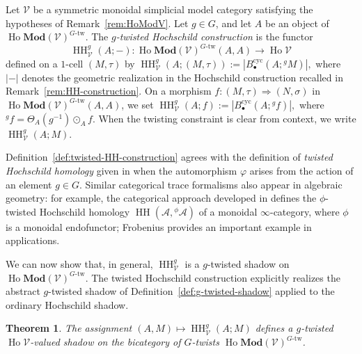 \documentclass[11pt,oneside]{amsart}
\DeclareMathOperator{\Ho}{Ho}
\DeclareMathOperator{\HH}{HH}
\numberwithin{equation}{section}
\numberwithin{figure}{section}
\theoremstyle{plain}
\newtheorem{thm}{Theorem}[section]
\theoremstyle{definition}
\theoremstyle{remark}
\begin{document}
\begin{definition}\label{def:twisted-HH-construction}
Let \(\mathcal V\) be a symmetric monoidal simplicial model category
satisfying the hypotheses of Remark~\ref{rem:HoModV}. Let \(g\in G\),
and let \(A\) be an object of
\(\Ho\mathbf{Mod}(\mathcal V)^{G\text{-tw}}\). The \emph{\(g\)-twisted Hochschild construction}
is the functor
\[
\HH_{\mathcal V}^g(A;-):
\Ho\mathbf{Mod}(\mathcal V)^{G\text{-tw}}(A,A)
\longrightarrow
\Ho\mathcal V
\]
defined on a \(1\)-cell \((M,\tau)\) by
\(
\HH_{\mathcal V}^g(A;(M,\tau))
:=
\left|B_\bullet^{\mathrm{cyc}}(A;{}^gM)\right|,
\)
where \(|-|\) denotes the geometric realization in the Hochschild construction
recalled in Remark~\ref{rem:HH-construction}.
On a morphism
\(
f:(M,\tau)\Rightarrow (N,\sigma)
\)
in \(\Ho\mathbf{Mod}(\mathcal V)^{G\text{-tw}}(A,A)\), we set
\(
\HH_{\mathcal V}^g(A;f)
:=
\left|B_\bullet^{\mathrm{cyc}}(A;{}^gf)\right|,
\)
where \({}^gf=\Theta_A(g^{-1})\odot_A f\).
When the twisting constraint is clear from context, we write
\(\HH_{\mathcal V}^g(A;M)\).
\end{definition}


 

\begin{remark}
Definition~\ref{def:twisted-HH-construction} agrees with the definition of
\emph{twisted Hochschild homology} given in \cite[Def.~4.1.3]{AGHKK} when the automorphism
$\varphi$ arises from the action of an element $g \in G$.
Similar categorical trace formalisms also appear in algebraic geometry:
for example, the categorical approach developed in \cite{Hemo} defines the
$\phi$-twisted Hochschild homology
$\HH(\mathcal A, {}^\phi\mathcal A)$ of a monoidal $\infty$-category,
where $\phi$  is a monoidal endofunctor; Frobenius provides an
important example in applications.
\end{remark}


We can now show that, in general, $\HH_{\mathcal{V}}^g$ is a $g$-twisted shadow on $\Ho\mathbf{Mod}(\mathcal{V})^{G\text{-tw}}$. The twisted Hochschild construction explicitly realizes the abstract $g$-twisted shadow of Definition~\ref{def:g-twisted-shadow} applied to the ordinary Hochschild shadow.



\begin{thm}\label{thm:twisted-HH-shadow}
The assignment
\(
(A,M)\mapsto\HH_{\mathcal V}^g(A;M)
\)
defines a \(g\)-twisted \(\Ho\mathcal V\)-valued shadow on the bicategory of $G$-twists 
$\Ho\mathbf{Mod}(\mathcal V)^{G\text{-tw}}$.
\end{thm}
\end{document}
